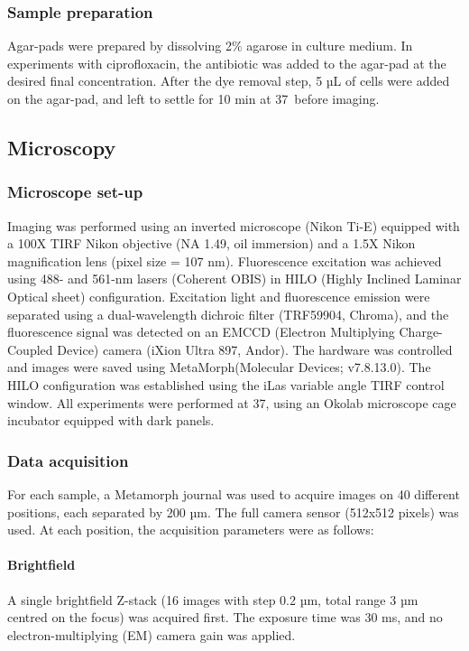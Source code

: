 \subsubsection*{Sample preparation}
Agar-pads were prepared by dissolving 2\% agarose in culture medium. In experiments with ciprofloxacin, the antibiotic was added to the agar-pad at the desired final concentration. After the dye removal step, 5 µL of cells were added on the agar-pad, and left to settle for 10 min at 37\celsius\ before imaging.


\subsection*{Microscopy}
\subsubsection*{Microscope set-up}
Imaging was performed using an inverted microscope (Nikon Ti-E) equipped with a 100X TIRF Nikon objective (NA 1.49, oil immersion) and a 1.5X Nikon magnification lens (pixel size = 107 nm). Fluorescence excitation was achieved using 488- and 561-nm lasers (Coherent OBIS) in HILO (Highly Inclined Laminar Optical sheet) configuration. Excitation light and fluorescence emission were separated using a dual-wavelength dichroic filter (TRF59904, Chroma), and the fluorescence signal was detected on an EMCCD (Electron Multiplying Charge-Coupled Device) camera (iXion Ultra 897, Andor). The hardware was controlled and images were saved using MetaMorph(Molecular Devices; v7.8.13.0). The HILO configuration was established using the iLas variable angle TIRF control window. All experiments were performed at 37\celsius, using an Okolab microscope cage incubator equipped with dark panels.

\subsubsection*{Data acquisition}
For each sample, a Metamorph journal was used to acquire images on 40 different positions, each separated by 200 µm. The full camera sensor (512x512 pixels) was used. At each position, the acquisition parameters were as follows:

\paragraph{Brightfield} A single brightfield Z-stack (16 images with step 0.2 µm, total range 3 µm centred on the focus) was acquired first. The exposure time was 30 ms, and no electron-multiplying (EM) camera gain was applied.

